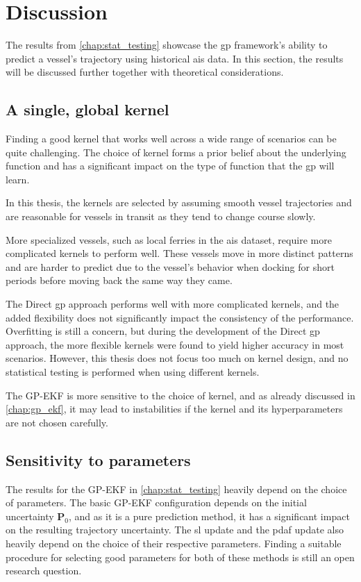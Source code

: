 \chapter{Discussion}\label{chap:discussion}

The results from \cref{chap:stat_testing} showcase the \acrshort{gp} framework's ability to predict a vessel's trajectory using historical \acrshort{ais} data. In this section, the results will be discussed further together with theoretical considerations.

\section{A single, global kernel}
Finding a good kernel that works well across a wide range of scenarios can be quite challenging. The choice of kernel forms a prior belief about the underlying function and has a significant impact on the type of function that the \acrshort{gp} will learn. 

In this thesis, the kernels are selected by assuming smooth vessel trajectories and are reasonable for vessels in transit as they tend to change course slowly. 

More specialized vessels, such as local ferries in the \acrshort{ais} dataset, require more complicated kernels to perform well. These vessels move in more distinct patterns and are harder to predict due to the vessel's behavior when docking for short periods before moving back the same way they came. 

The Direct \acrshort{gp} approach performs well with more complicated kernels, and the added flexibility does not significantly impact the consistency of the performance. Overfitting is still a concern, but during the development of the Direct \acrshort{gp} approach, the more flexible kernels were found to yield higher accuracy in most scenarios. However, this thesis does not focus too much on kernel design, and no statistical testing is performed when using different kernels.

The GP-EKF is more sensitive to the choice of kernel, and as already discussed in \cref{chap:gp_ekf}, it may lead to instabilities if the kernel and its hyperparameters are not chosen carefully.  

\section{Sensitivity to parameters}
The results for the GP-EKF in \cref{chap:stat_testing} heavily depend on the choice of parameters. The basic GP-EKF configuration depends on the initial uncertainty $\boldsymbol{P}_0$, and as it is a pure prediction method, it has a significant impact on the resulting trajectory uncertainty. The \acrshort{sl} update and the \acrshort{pdaf} update also heavily depend on the choice of their respective parameters. Finding a suitable procedure for selecting good parameters for both of these methods is still an open research question. 

